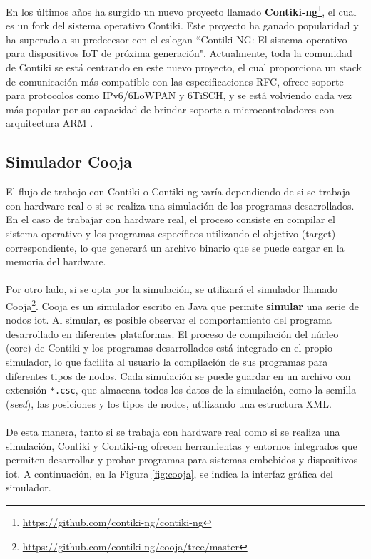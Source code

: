 En los últimos años ha surgido un nuevo proyecto llamado \textbf{Contiki-ng}\footnote{\url{https://github.com/contiki-ng/contiki-ng}}, el cual es un fork del sistema operativo Contiki. Este proyecto ha ganado popularidad y ha superado a su predecesor con el eslogan ``Contiki-NG: El sistema operativo para dispositivos IoT de próxima generación". Actualmente, toda la comunidad de Contiki se está centrando en este nuevo proyecto, el cual proporciona un stack de comunicación más compatible con las especificaciones RFC, ofrece soporte para protocolos como IPv6/6LoWPAN y 6TiSCH, y se está volviendo cada vez más popular por su capacidad de brindar soporte a microcontroladores con arquitectura ARM \cite{kurniawan2018practical}.

\subsection{Simulador Cooja}

El flujo de trabajo con Contiki o Contiki-ng varía dependiendo de si se trabaja con hardware real o si se realiza una simulación de los programas desarrollados. En el caso de trabajar con hardware real, el proceso consiste en compilar el sistema operativo y los programas específicos utilizando el objetivo (target) correspondiente, lo que generará un archivo binario que se puede cargar en la memoria del hardware.\\
\\
Por otro lado, si se opta por la simulación, se utilizará el simulador llamado Cooja\footnote{\url{https://github.com/contiki-ng/cooja/tree/master}}. Cooja es un simulador escrito en Java que permite \textbf{simular} una serie de nodos \gls{iot}. Al simular, es posible observar el comportamiento del programa desarrollado en diferentes plataformas. El proceso de compilación del núcleo (core) de Contiki y los programas desarrollados está integrado en el propio simulador, lo que facilita al usuario la compilación de sus programas para diferentes tipos de nodos. Cada simulación se puede guardar en un archivo con extensión \texttt{*.csc}, que almacena todos los datos de la simulación, como la semilla (\textit{seed}), las posiciones y los tipos de nodos, utilizando una estructura XML.\\
\\
De esta manera, tanto si se trabaja con hardware real como si se realiza una simulación, Contiki y Contiki-ng ofrecen herramientas y entornos integrados que permiten desarrollar y probar programas para sistemas embebidos y dispositivos \gls{iot}. A continuación, en la Figura \ref{fig:cooja}, se indica la interfaz gráfica del simulador.

